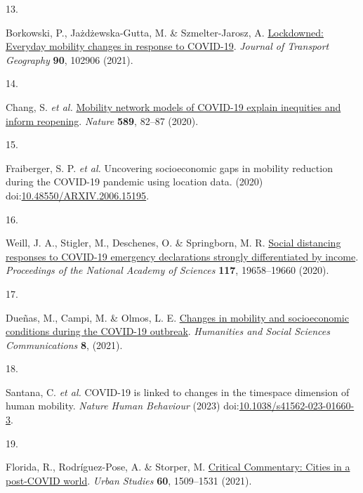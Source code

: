 \documentclass[
  11pt,
]{article}
\newlength{\cslhangindent}
\newlength{\csllabelwidth}
\newlength{\cslentryspacingunit} %
\newenvironment{CSLReferences}[2] %
 {%
  \setlength{\parindent}{0pt}
  \ifodd #1
  \let\oldpar\par
  \def\par{\hangindent=\cslhangindent\oldpar}
  \fi
  \setlength{\parskip}{#2\cslentryspacingunit}
 }%
 {}
\newcommand{\CSLLeftMargin}[1]{\parbox[t]{\csllabelwidth}{#1}}
\newcommand{\CSLRightInline}[1]{\parbox[t]{\linewidth - \csllabelwidth}{#1}\break}
\begin{document}
\begin{CSLReferences}{0}{0}
\leavevmode{}%
\CSLLeftMargin{13. }%
\CSLRightInline{Borkowski, P., Jażdżewska-Gutta, M. \& Szmelter-Jarosz,
A. \href{https://doi.org/10.1016/j.jtrangeo.2020.102906}{Lockdowned:
Everyday mobility changes in response to COVID-19}. \emph{Journal of
Transport Geography} \textbf{90}, 102906 (2021).}

\leavevmode{}%
\CSLLeftMargin{14. }%
\CSLRightInline{Chang, S. \emph{et al.}
\href{https://doi.org/10.1038/s41586-020-2923-3}{Mobility network models
of COVID-19 explain inequities and inform reopening}. \emph{Nature}
\textbf{589}, 82--87 (2020).}

\leavevmode{}%
\CSLLeftMargin{15. }%
\CSLRightInline{Fraiberger, S. P. \emph{et al.} Uncovering socioeconomic
gaps in mobility reduction during the COVID-19 pandemic using location
data. (2020)
doi:\href{https://doi.org/10.48550/ARXIV.2006.15195}{10.48550/ARXIV.2006.15195}.}

\leavevmode{}%
\CSLLeftMargin{16. }%
\CSLRightInline{Weill, J. A., Stigler, M., Deschenes, O. \& Springborn,
M. R. \href{https://doi.org/10.1073/pnas.2009412117}{Social distancing
responses to COVID-19 emergency declarations strongly differentiated by
income}. \emph{Proceedings of the National Academy of Sciences}
\textbf{117}, 19658--19660 (2020).}

\leavevmode{}%
\CSLLeftMargin{17. }%
\CSLRightInline{Dueñas, M., Campi, M. \& Olmos, L. E.
\href{https://doi.org/10.1057/s41599-021-00775-0}{Changes in mobility
and socioeconomic conditions during the COVID-19 outbreak}.
\emph{Humanities and Social Sciences Communications} \textbf{8},
(2021).}

\leavevmode{}%
\CSLLeftMargin{18. }%
\CSLRightInline{Santana, C. \emph{et al.} COVID-19 is linked to changes
in the time{\textendash}space dimension of human mobility. \emph{Nature
Human Behaviour} (2023)
doi:\href{https://doi.org/10.1038/s41562-023-01660-3}{10.1038/s41562-023-01660-3}.}

\leavevmode{}%
\CSLLeftMargin{19. }%
\CSLRightInline{Florida, R., Rodríguez-Pose, A. \& Storper, M.
\href{https://doi.org/10.1177/00420980211018072}{Critical Commentary:
Cities in a post-COVID world}. \emph{Urban Studies} \textbf{60},
1509--1531 (2021).}


\end{CSLReferences}
\end{document}
